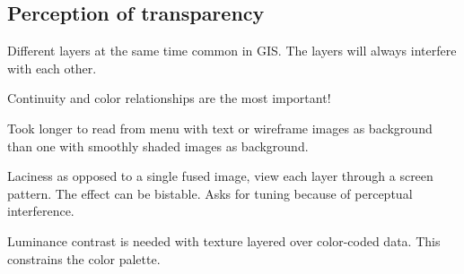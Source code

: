 \begin{mdframed}\begin{multicols}{2}
\subsection{Perception of transparency}
\begin{compactdesc}
    \item[Different layers at the same time] common in GIS. The layers
        will always interfere with each other.
    \item[Continuity and color] relationships are the most important!
    \item[Took longer] to read from menu with text or wireframe images
        as background than one with smoothly shaded images as background.
    \item[Laciness] as opposed to a single fused image, view each layer through
        a screen pattern. The effect can be bistable. Asks for tuning because
        of perceptual interference.
    \item[Luminance contrast] is needed with texture layered over color-coded
        data. This constrains the color palette.
\end{compactdesc}
\end{multicols}\end{mdframed}



